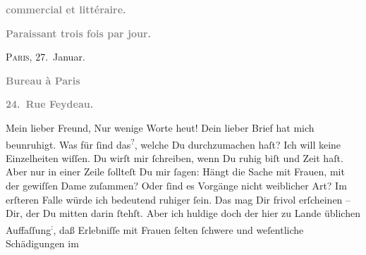 \begin{ledgroupsized}[t]{13cm}
           \pstart
           \begin{otherlanguage}{french}\textcolor{gray}{\textbf{commercial et littéraire.}}\end{otherlanguage}\pend
           \pstart
           \begin{otherlanguage}{french}\textcolor{gray}{\textbf{\textbf{Paraissant trois fois par jour.}}}\end{otherlanguage}\hfill \textsc{Paris}, 27. Januar.\pend
           \pstart
           \begin{otherlanguage}{french}\textcolor{gray}{\textbf{\textbf{Bureau à Paris}}}\end{otherlanguage}\pend
           \pstart
           \begin{otherlanguage}{french}\textcolor{gray}{\textbf{\textbf{24. Rue Feydeau.}}}\end{otherlanguage}\pend
           \pstart\center{}Mein lieber Freund,\pend\pstart
           Nur wenige Worte heut!\pend
           \pstart
           Dein lieber Brief hat mich beunruhigt. Was für \label{K_L02801-1v}\label{K_L02801-1h} ſind das\substVorne{}\textsuperscript{?}\substDazwischen{},\substHinten{} welche Du durchzumachen haſt? Ich will keine Einzelheiten wiſſen. Du wirſt
               mir ſchreiben, wenn Du ruhig biſt und Zeit haſt. Aber nur in einer Zeile ſollteſt Du
               mir ſagen: Hängt die Sache mit Frauen, mit der gewiſſen Dame zuſammen? Oder ſind es Vorgänge nicht
               weiblicher Art? Im erſteren Falle würde ich bedeutend ruhiger  ſein. Das mag Dir frivol erſcheinen – Dir, der Du mitten darin ſtehſt. Aber
               ich {\pb}huldige doch der hier zu Lande üblichen Auffaſſung\substVorne{}\textsuperscript{:}\substDazwischen{},\substHinten{} daß Erlebniſſe mit Frauen ſelten ſchwere und weſentliche Schädigungen im

\end{ledgroupsized}
